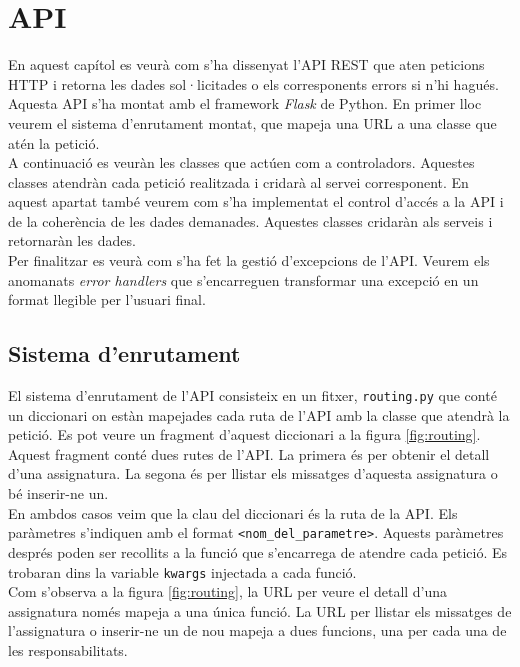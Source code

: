 \section{\ac{API}} \label{sec_api2}

En aquest capítol es veurà com s'ha dissenyat l'\ac{API} \ac{REST} que aten peticions \ac{HTTP} i retorna les dades sol·licitades o els corresponents errors si n'hi hagués. Aquesta \ac{API} s'ha montat amb el framework \emph{Flask} de Python. En primer lloc veurem el sistema d'enrutament montat, que mapeja una \ac{URL} a una classe que atén la petició.\\

A continuació es veuràn les classes que actúen com a controladors. Aquestes classes atendràn cada petició realitzada i cridarà al servei corresponent. En aquest apartat també veurem com s'ha implementat el control d'accés a la \ac{API} i de la coherència de les dades demanades.  Aquestes classes cridaràn als serveis i retornaràn les dades. \\

Per finalitzar es veurà com s'ha fet la gestió d'excepcions de l'\ac{API}. Veurem els anomanats \emph{error handlers} que s'encarreguen transformar una excepció en un format llegible per l'usuari final.

\subsection{Sistema d'enrutament}
El sistema d'enrutament de l'\ac{API} consisteix en un fitxer, \texttt{routing.py} que conté un diccionari on estàn mapejades cada ruta de l'\ac{API} amb la classe que atendrà la petició. Es pot veure un fragment d'aquest diccionari a la figura \ref{fig:routing}. Aquest fragment conté dues rutes de l'\ac{API}. La primera és per obtenir el detall d'una assignatura. La segona és per llistar els missatges d'aquesta assignatura o bé inserir-ne un.\\

En ambdos casos veim que la clau del diccionari és la ruta de la \ac{API}. Els paràmetres s'indiquen amb el format \texttt{<nom\_del\_parametre>}. Aquests paràmetres després poden ser recollits a la funció que s'encarrega de atendre cada petició. Es trobaran dins la variable \texttt{kwargs} injectada a cada funció. \\

Com s'observa a la figura \ref{fig:routing}, la \ac{URL} per veure el detall d'una assignatura només mapeja a una única funció. La \ac{URL} per llistar els missatges de l'assignatura o inserir-ne un de nou mapeja a dues funcions, una per cada una de les responsabilitats.\\

